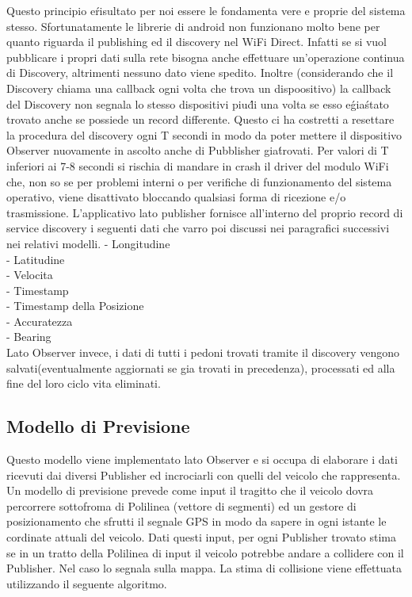 \documentclass[conference]{IEEEtran}
\begin{document}
Questo principio e\'risultato per noi essere le fondamenta vere e proprie del sistema stesso.
Sfortunatamente le librerie di android non funzionano molto bene per quanto riguarda il publishing ed il discovery nel WiFi Direct. Infatti se si vuol pubblicare i propri dati sulla rete bisogna anche effettuare un'operazione continua di Discovery, altrimenti nessuno dato viene spedito. Inoltre (considerando che il Discovery chiama una callback ogni volta che trova un dispoositivo) la callback del Discovery non segnala lo stesso dispositivi piu\' di una volta se esso e\' gia\' stato trovato anche se possiede un record differente.
Questo ci ha costretti a resettare la procedura del discovery ogni T secondi in modo da poter mettere il dispositivo Observer nuovamente in ascolto anche di Pubblisher gia\' trovati.
Per valori di T inferiori ai 7-8 secondi si rischia di mandare in crash il driver del modulo WiFi che, non so se per problemi interni o per verifiche di funzionamento del sistema operativo, viene disattivato bloccando qualsiasi forma di ricezione e/o trasmissione.
L'applicativo lato publisher fornisce all'interno del proprio record di service discovery i seguenti dati che varro poi discussi nei paragrafici successivi nei relativi modelli.
- Longitudine\\
- Latitudine\\
- Velocita\\
- Timestamp\\
- Timestamp della Posizione\\
- Accuratezza\\
- Bearing\\
Lato Observer invece, i dati di tutti i pedoni trovati tramite il discovery vengono salvati(eventualmente aggiornati se gia trovati in precedenza), processati ed alla fine del loro ciclo vita eliminati.


\subsection{Modello di Previsione}
Questo modello viene implementato lato Observer e si occupa di elaborare i dati ricevuti dai diversi Publisher ed incrociarli con quelli del veicolo che rappresenta.
Un modello di previsione prevede come input il tragitto che il veicolo dovra percorrere sottofroma di Polilinea (vettore di segmenti) ed un gestore di posizionamento che sfrutti il segnale GPS in modo da sapere in ogni istante le cordinate attuali del veicolo.
Dati questi input, per ogni Publisher trovato stima se in un tratto della Polilinea di input il veicolo potrebbe andare a collidere con il Publisher. Nel caso lo segnala sulla mappa.
La stima di collisione viene effettuata utilizzando il seguente algoritmo.
 
\end{document}
